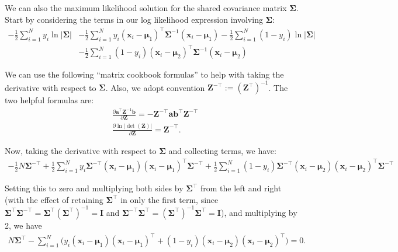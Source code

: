 We can also the maximum likelihood solution for the shared covariance matrix $\boldsymbol{\Sigma}$. Start by considering the terms in our log likelihood expression involving $\boldsymbol{\Sigma}$:
\begin{align*}
  -\frac{1}{2} \sum_{i=1}^{N} y_{i} \ln{|\boldsymbol{\Sigma}|} &-\frac{1}{2} \sum_{i=1}^{N} y_{i} (\textbf{x}_{i} - \boldsymbol{\mu}_{1})^\top\boldsymbol{\Sigma}^{-1}(\textbf{x}_{i} - \boldsymbol{\mu}_{1}) -\frac{1}{2} \sum_{i=1}^{N} (1-y_{i}) \ln{|\boldsymbol{\Sigma}|} 
  \\
  & -\frac{1}{2} \sum_{i=1}^{N} (1-y_{i}) (\textbf{x}_{i} - \boldsymbol{\mu}_{2})^\top\boldsymbol{\Sigma}^{-1}(\textbf{x}_{i} - \boldsymbol{\mu}_{2})
\end{align*}


We can use the following ``matrix cookbook formulas'' to help with taking  the derivative with respect to $\boldsymbol{\Sigma}$.
Also, we adopt convention 
${\mathbf Z}^{-\top} := (\mathbf{Z}^{\top})^{-1}$.
%
The two helpful formulas are:
\begin{align*}
  & \frac{\partial \mathbf{a}^\top \mathbf{Z}^{-1} \mathbf{b}}{\partial \mathbf{Z}} = - \mathbf{Z}^{-\top} \mathbf{a} \mathbf{b}^\top \mathbf{Z}^{-\top} \\
  & \frac{\partial \ln | \det (\mathbf{Z}) |}{\partial \mathbf{Z}} = \mathbf{Z}^{-\top}.
 \end{align*}

 Now, taking the derivative with respect to $\boldsymbol{\Sigma}$ and collecting terms, we have:
\begin{align*}
-\frac{1}{2}	N\boldsymbol{\Sigma}^{-\top} + \frac{1}{2}\sum_{i=1}^{N} y_{i} \boldsymbol{\Sigma}^{-\top}(\textbf{x}_{i} - \boldsymbol{\mu}_{1})(\textbf{x}_{i} - \boldsymbol{\mu}_{1})^\top\boldsymbol{\Sigma}^{-\top} + \frac{1}{2}\sum_{i=1}^{N} (1-y_{i}) \boldsymbol{\Sigma}^{-\top}(\textbf{x}_{i} - \boldsymbol{\mu}_{2})(\textbf{x}_{i} - \boldsymbol{\mu}_{2})^\top\boldsymbol{\Sigma}^{-\top}
\end{align*}

Setting this to zero and multiplying both sides by $\boldsymbol{\Sigma}^\top$
from the left and right (with the effect of retaining $\boldsymbol{\Sigma}^\top$ in only the first term, since $\boldsymbol{\Sigma}^\top \boldsymbol{\Sigma}^{-\top}=\boldsymbol{\Sigma}^\top\left(\boldsymbol{\Sigma}^\top\right)^{-1}=\mathbf{I}$ and $\boldsymbol{\Sigma}^{-\top} \boldsymbol{\Sigma}^{\top}=\left(\boldsymbol{\Sigma}^\top\right)^{-1}\boldsymbol{\Sigma}^{\top}=\mathbf{I}$), and multiplying by 2, 
we have
\begin{align*}
N	\boldsymbol{\Sigma}^\top - \sum_{i=1}^{N} \bigg( y_{i}(\textbf{x}_{i} - \boldsymbol{\mu}_{1})(\textbf{x}_{i} - \boldsymbol{\mu}_{1})^\top + (1-y_{i})(\textbf{x}_{i} - \boldsymbol{\mu}_{2})(\textbf{x}_{i} - \boldsymbol{\mu}_{2})^\top \bigg) = 0.
\end{align*}

